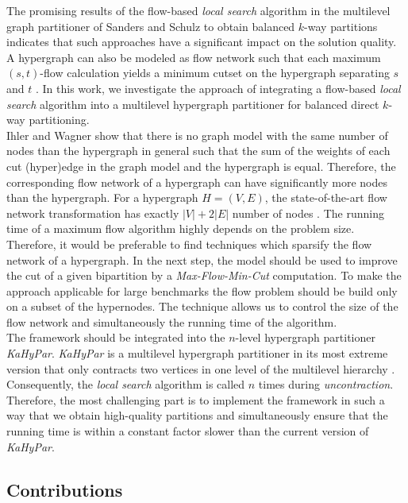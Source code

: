 The promising results of the flow-based \emph{local search} algorithm in the multilevel graph 
partitioner of Sanders and Schulz \cite{sanders2011engineering} to obtain balanced $k$-way
partitions indicates that such approaches have a significant impact on the solution
quality. A hypergraph can also be modeled as flow network such that each maximum $(s,t)$-flow calculation yields
a minimum cutset on the hypergraph separating $s$ and $t$ \cite{lawler1973,yang1996balanced}.
In this work, we investigate the approach of integrating a flow-based \emph{local search}
algorithm into a multilevel hypergraph partitioner for balanced direct $k$-way partitioning.\\
Ihler and Wagner \cite{ihler1993modeling} show that there is no graph model with the same
number of nodes than the hypergraph in general such that the sum of the weights of each cut (hyper)edge
in the graph model and the hypergraph is equal. Therefore, the corresponding flow network of a hypergraph
can have significantly more nodes than the hypergraph. For a hypergraph $H = (V,E)$, the state-of-the-art flow network
transformation has exactly $|V| + 2|E|$ number of nodes \cite{lawler1973,yang1996balanced}.
The running time of a maximum flow algorithm highly depends on the problem size. Therefore,
it would be preferable to find techniques which sparsify the flow network of a hypergraph.
In the next step, the model should be used to improve the cut of a given bipartition 
by a \emph{Max-Flow-Min-Cut} computation. To make the approach applicable for large benchmarks
the flow problem should be build only on a subset of the hypernodes. The technique allows
us to control the size of the flow network and simultaneously the running time of the
algorithm. \\
The framework should be integrated into the $n$-level hypergraph partitioner 
\emph{KaHyPar}. \emph{KaHyPar} is a multilevel hypergraph partitioner in its most extreme 
version that only contracts two vertices in one level of the multilevel hierarchy
\cite{akhremtsev2017engineering,heuer2017improving,schlag2016k}. Consequently, the 
\emph{local search} algorithm is called $n$ times during \emph{uncontraction}.
Therefore, the most challenging part is to implement the framework in such a way that we obtain
high-quality partitions and simultaneously ensure that the running time is within
a constant factor slower than the current version of \emph{KaHyPar}.

\subsection{Contributions}

